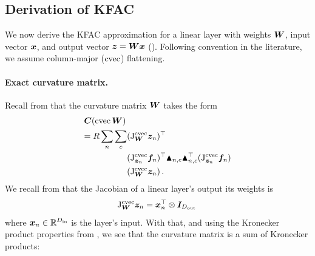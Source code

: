 

\subsection{Derivation of KFAC}

We now derive the KFAC approximation for a linear layer with weights ${\bm{W}}$, input vector ${\bm{x}}$, and output vector ${\bm{z}} = {\bm{W}}{\bm{x}}$ ().
Following convention in the literature, we assume column-major ($\operatorname{cvec}$) flattening.

\paragraph{Exact curvature matrix.}
Recall from  that the curvature matrix \wrt ${\bm{W}}$ takes the form
\begin{align*}
  &{\bm{C}}(\operatorname{cvec} {\bm{W}}) \\
  &\begin{aligned}=
    R \sum_n \sum_c &(\mathrm{J}^{\operatorname{cvec}}_{{\bm{W}}}{\bm{z}}_n)^{\top} \\
                    &(\mathrm{J}^{\operatorname{cvec}}_{{\bm{z}}_n}{\bm{f}}_n)^{\top}
                      \blacktriangle_{n,c} \blacktriangle_{n,c}^{\top}
                      (\mathrm{J}^{\operatorname{cvec}}_{{\bm{z}}_n}{\bm{f}}_n) \\
                    &(\mathrm{J}^{\operatorname{cvec}}_{{\bm{W}}}{\bm{z}}_n)\,.
  \end{aligned}
\end{align*}
We recall from  that the Jacobian of a linear layer's output \wrt its weights is
$$ \mathrm{J}^{\operatorname{cvec}}_{{\bm{W}}}{\bm{z}}_n = {\bm{x}}_n^{\top} \otimes {\bm{I}}_{D_{\text{out}}}\, $$
where ${\bm{x}}_n \in \mathbb{R}^{D_\text{in}}$ is the layer's input.
With that, and using the Kronecker product properties from , we see that the curvature matrix is a sum of Kronecker products:
